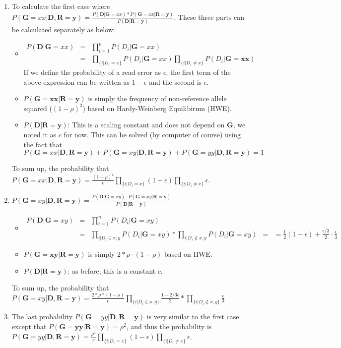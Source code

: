 \documentclass[]{article}
\begin{document}
\begin{enumerate}
\item To calculate the first case where $P(\mathbf{G}=xx | \mathbf{D,R=y}) = \frac{P(\mathbf{D|G}=xx)*P(\mathbf{G}=xx|\mathbf{R=y})}{P(\mathbf{D|R=y})}$.
These three parts can be calculated separately as below:
\begin{itemize}
\item
\begin{eqnarray*}
P(\mathbf{D|G}=xx) &=& \prod_{i=1}^n P(D_i|\mathbf{G}=xx)\\
&=& \prod_{\{i|D_i=x\}} P(D_i|\mathbf{G}=xx) \prod_{\{i|D_i\ne x\}} P(D_i|\mathbf{G=xx})
\end{eqnarray*}
If we define the probability of a read error as $\epsilon$, the first term of the above expression can be written as $1-\epsilon$ and the second is $\epsilon$.\
\item $P(\mathbf{G=xx|R=y})$ is simply the frequency of non-reference allele squared ($(1-\rho)^2$) based on Hardy-Weinberg Equilibirum (HWE).
\item $P(\mathbf{D|R=y})$: This is a scaling constant and does not depend on $\mathbf{G}$, we noted it as $c$ for now. This can be solved (by computer of course) using the fact that $P(\mathbf{G}=xx | \mathbf{D,R=y})+P(\mathbf{G}=xy | \mathbf{D,R=y})+P(\mathbf{G}=yy | \mathbf{D,R=y})=1$
\end{itemize}
To sum up, the probability that $P(\mathbf{G}=xx | \mathbf{D,R=y}) = \frac{(1-\rho)^2}{c}\prod_{\{i|D_i=x\}} (1-\epsilon) \prod_{\{i|D_i\ne x\}} \epsilon$.
\item $P(\mathbf{G}=xy | \mathbf{D,R=y}) = \frac{P(\mathbf{D|G}=xy)\cdot P(\mathbf{G}=xy|\mathbf{R=y})}{P(\mathbf{D|R=y})}$
\begin{itemize}
\item 
\begin{eqnarray*}
P(\mathbf{D|G}=xy) &=& \prod_{i=1}^n P(D_i|\mathbf{G}=xy)\\
&=& \prod_{i|D_i\in {x,y}} P(D_i|\mathbf{G}=xy) * \prod_{i|D_i\notin {x,y}} P(D_i|\mathbf{G}=xy)
&=& = \frac{1}{2}(1-\epsilon)+\frac{\epsilon/3}{2} \cdot \frac{\epsilon}{3}
\end{eqnarray*} 
\item $P(\mathbf{G=xy|R=y})$ is simply $2*\rho \cdot (1-\rho)$ based on HWE.
\item $P(\mathbf{D|R=y})$: as before, this is a constant $c$.
\end{itemize}
To sum up, the probability that $P(\mathbf{G}=xy | \mathbf{D,R=y}) = \frac{2*\rho*(1-\rho)}{c} \prod_{\{i|D_i\in {x,y}\}}\frac{1-2/3\epsilon}{2} * \prod_{\{i|D_i\notin {x,y}\}} \frac{\epsilon}{3}$
\item The last probability $P(\mathbf{G}=yy | \mathbf{D,R=y})$ is very similar to the first case except that $P(\mathbf{G=yy|R=y}) = \rho^2$, and thus the probability is $P(\mathbf{G}=yy | \mathbf{D,R=y}) = \frac{\rho^2}{c}\prod_{\{i|D_i=x\}} (1-\epsilon) \prod_{\{i|D_i\ne x\}} \epsilon$. 
\end{enumerate}
\end{document}
